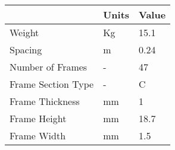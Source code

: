 \begin{tabular}{lll}
& Units & Value \\ 
\hline 
Weight & Kg & 15.1 \\ 
Spacing & m & 0.24 \\ 
Number of Frames & - & 47 \\ 
Frame Section Type & - & C \\ 
Frame Thickness & mm & 1 \\ 
Frame Height & mm & 18.7 \\ 
Frame Width & mm & 1.5 \\ 
\hline 
\end{tabular}